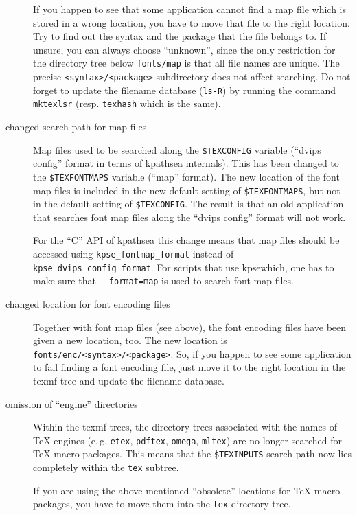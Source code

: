 \documentclass[11pt,a4paper]{article}
\begin{document}
\begin{description}
  If you happen to see that some application cannot find a map file
  which is stored in a wrong location, you have to move that file to
  the right location. Try to find out the syntax and the package that
  the file belongs to. If unsure, you can always choose ``unknown'',
  since the only restriction for the directory tree below
  \verb+fonts/map+ is that all file names are unique. The precise
  \verb+<syntax>/<package>+ subdirectory does not affect searching. Do
  not forget to update the filename database (\verb+ls-R+) by running
  the command \verb+mktexlsr+ (resp.  \verb+texhash+ which is the
  same).

\item [changed search path for map files] Map files used to be
  searched along the \verb+$TEXCONFIG+ %
  variable (``dvips config'' format in terms of kpathsea internals).
  This has been changed to the \verb+$TEXFONTMAPS+ %
  variable (``map'' format). The new location of the font map files is
  included in the new default setting of \verb+$TEXFONTMAPS+, %
  but not in the default setting of \verb+$TEXCONFIG+. %
  The result is that an old application that searches font map files
  along the ``dvips config'' format will not work.
  
  For the ``C'' API of kpathsea this change means that map files
  should be accessed using \verb+kpse_fontmap_format+ instead of
  \verb+kpse_dvips_config_format+. For scripts that use kpsewhich, one
  has to make sure that \verb+--format=map+ is used to search font map
  files.
  
\item [changed location for font encoding files] Together with font
  map files (see above), the font encoding files have been given a new
  location, too. The new location is
  \verb+fonts/enc/<syntax>/<package>+. So, if you happen to see some
  application to fail finding a font encoding file, just move it to
  the right location in the texmf tree and update the filename
  database.
  
\item [omission of ``engine'' directories] Within the texmf trees, the
  directory trees associated with the names of \TeX{} engines (e.\,g.
  \verb+etex+, \verb+pdftex+, \verb+omega+, \verb+mltex+) are no
  longer searched for \TeX{} macro packages. This means that the \verb+$TEXINPUTS+ %
  search path now lies completely within the \verb+tex+ subtree.
  
  If you are using the above mentioned ``obsolete'' locations for
  \TeX{} macro packages, you have to move them into the \verb+tex+
  directory tree.


\end{description}
\end{document}
